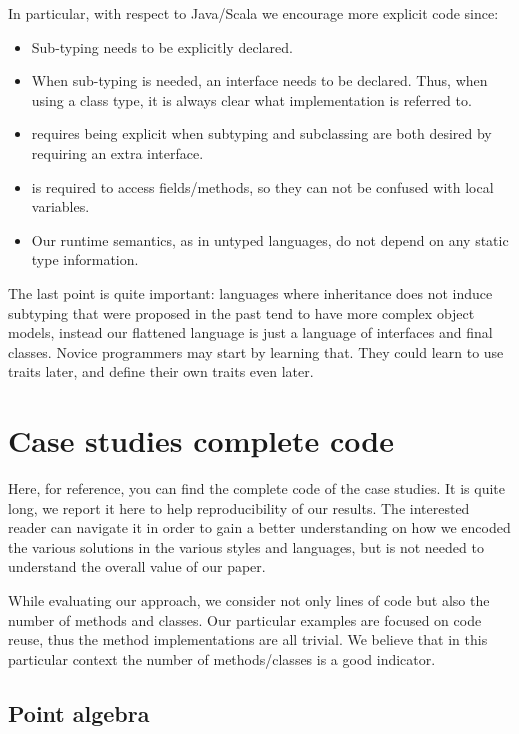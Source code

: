 In particular, with respect to Java/Scala we encourage more explicit code since:
\begin{itemize}
\item Sub-typing needs to be explicitly declared.
\item When sub-typing is needed, an interface needs to be declared. Thus, when using a class type, it is always clear what implementation is referred to.
\item \name requires being explicit when subtyping and subclassing are both desired by requiring an extra interface.
\item \Q@this@ is required to access fields/methods, so they can not be confused with local variables.
\item 
Our runtime semantics, as in untyped languages, do not depend on any static type information.
\end{itemize}
The last point is quite important: languages where inheritance does not induce subtyping that were proposed in the past tend to have more complex object models, instead 
our flattened language is just a language of interfaces and final classes. Novice programmers may start by learning that. They could learn to use traits later, and define their own traits even later.

\section{Case studies complete code} 

Here, for reference, you can find the complete
code of the case studies.
It is quite long, we report it here to
help reproducibility of our results. The interested reader
can navigate it in order to gain a better understanding on
how we encoded the various solutions in the various styles and languages,
but is not needed to understand the overall value of our paper.

While evaluating our approach, we consider not only lines of code but also the number of methods and classes.
Our particular examples are focused on code reuse, thus the method implementations are all trivial.
We believe that in this particular context the number of methods/classes is a good indicator.


\subsection{Point algebra}
